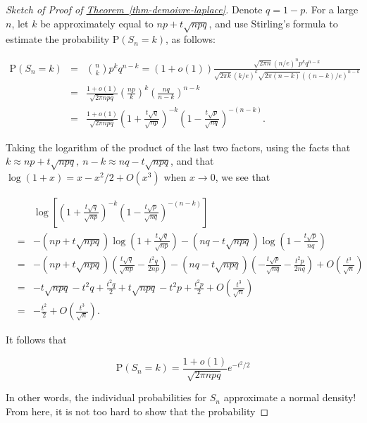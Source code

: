 \documentclass[11pt]{report}
\theoremstyle{plain}
\theoremstyle{definition}
\begin{document}
\begin{proof}[Sketch of Proof of \texorpdfstring{\hyperref[thm-demoivre-laplace]{Theorem~\ref*{thm-demoivre-laplace}}}{Theorem}]
Denote $q=1-p$. For a large $n$, let $k$ be
approximately equal to $np+t\sqrt{npq}$, and use
Stirling's formula to estimate the probability
$\mathrm{P}(S_n=k)$, as follows:

\begin{eqnarray*}
\mathrm{P}(S_n = k) &=& \binom{n}{k} p^k q^{n-k} = (1+o(1)) \frac{\sqrt{2\pi n} (n/e)^n p^k q^{n-k}}{ \sqrt{2\pi k} (k/e)^k \sqrt{2\pi (n-k)} ((n-k)/e)^{n-k}} \\
&=&  \frac{1+o(1)}{\sqrt{2\pi n p q}} \left(\frac{np}{k}\right)^k \left( \frac{nq}{n-k}\right)^{n-k} \\
&=& \frac{1+o(1)}{\sqrt{2\pi n p q}} \left(1+\frac{t\sqrt{q}}{\sqrt{np}}\right)^{-k} \left(1- \frac{t\sqrt{p}}{\sqrt{nq}}\right)^{-(n-k)}.
\end{eqnarray*}

\noindent Taking the logarithm of the product of the last two
factors, using the facts that
$k\approx np+t\sqrt{npq},\ n-k\approx nq-t\sqrt{npq}$,
and that $\log(1+x)=x-x^2/2+O(x^3)$ when $x\to0$, we
see that

\begin{eqnarray*}
&&\log\left[\left(1+\frac{t\sqrt{q}}{\sqrt{np}}\right)^{-k} \left(1- \frac{t\sqrt{p}}{\sqrt{nq}}\right)^{-(n-k)}\right] \\
&=& -(np+t\sqrt{npq}) \log\left(1+\frac{t\sqrt{q}}{\sqrt{np}} \right)
- (nq-t\sqrt{npq}) \log\left(1-\frac{t\sqrt{p}}{nq}\right) \\
&=& -(np+t\sqrt{npq}) \left(\frac{t\sqrt{q}}{\sqrt{np}}-\frac{t^2 q}{2np} \right)
- (nq-t\sqrt{npq}) \left( -\frac{t\sqrt{p}}{\sqrt{nq}} - \frac{t^2 p}{2nq} \right) + O\left(\frac{t^3}{\sqrt{n}}\right) \\
&=& -t\sqrt{npq}  -t^2q + \frac{t^2 q}{2} + t \sqrt{npq} - t^2 p + \frac{t^2 p}{2} + O\left(\frac{t^3}{\sqrt{n}}\right) \\
&=& -\frac{t^2}{2} + O\left(\frac{t^3}{\sqrt{n}}\right).
\end{eqnarray*}

\noindent It follows that

\[
\mathrm{P}(S_n = k) = \frac{1+o(1)}{\sqrt{2\pi n p q}} e^{-t^2/2}
\]

\noindent In other words, the individual probabilities for $S_n$
approximate a normal density! From here, it is not too
hard to show that the probability


\end{proof}
\end{document}
